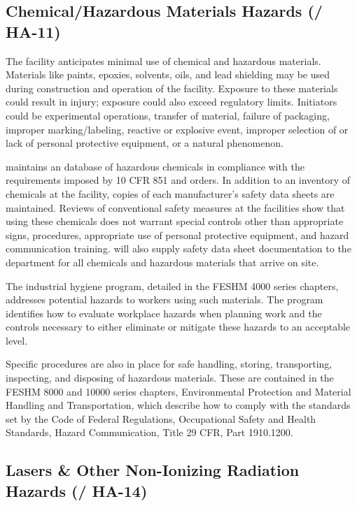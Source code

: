 \subsection{Chemical/Hazardous Materials Hazards (/ HA-11)}

The  facility anticipates minimal use of chemical and hazardous
materials. Materials like paints, epoxies, solvents, oils, and lead
shielding may be used during construction and operation of the
facility. Exposure to these materials could result in injury; 
exposure could also exceed regulatory limits. Initiators could be
experimental operations, transfer of material, failure of packaging,
improper marking/labeling, reactive or explosive event, improper
selection of or lack of personal protective equipment, or a
natural phenomenon.

\fnal maintains an database of hazardous chemicals in compliance
with the requirements imposed by 10 CFR 851 and  orders. In
addition to an inventory of chemicals at the facility, copies of each manufacturer's safety data sheets are
maintained. Reviews of conventional safety measures at the
facilities show that using these chemicals does not warrant special
controls other than appropriate signs, procedures, appropriate use of
personal protective equipment, and hazard communication training. 
will also supply safety data sheet documentation to the \surf {} department for all
chemicals and hazardous materials that arrive on site.

The industrial hygiene program, detailed in the FESHM 4000 series
chapters, addresses potential hazards to workers using such
materials. The program identifies how to evaluate workplace hazards
when planning work and the controls necessary to either eliminate or mitigate
these hazards to an acceptable level.

Specific procedures are also in place for safe handling, storing,
transporting, inspecting, and disposing of hazardous materials. These
are contained in the FESHM 8000 and 10000 series chapters,
Environmental Protection and Material Handling and Transportation,
which describe how to comply with the standards set by the Code of
Federal Regulations, Occupational Safety and Health Standards, Hazard
Communication, Title 29 CFR, Part 1910.1200.


\subsection{Lasers \& Other Non-Ionizing Radiation Hazards (/ HA-14)}

